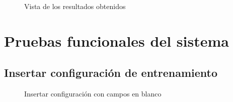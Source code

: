 {\begin{figure}[H]
\centering
 \caption{Vista de los resultados obtenidos}
 \label{fig:notas} 
\end{figure}

\chapter{Pruebas funcionales del sistema}

\section{Insertar configuración de entrenamiento}
\begin{figure}[H]
\centering
 \caption{Insertar configuración con campos en blanco}
 \label{fig:cb} 
\end{figure}

}
